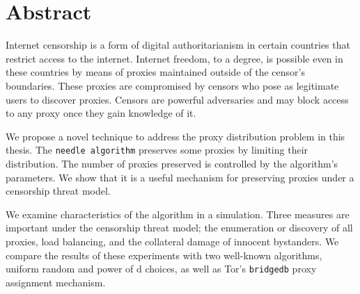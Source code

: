 \chapter{Abstract}
\label{sec:abstract}

Internet censorship is a form of digital authoritarianism in certain countries that restrict access to the internet. Internet freedom, to a degree, is possible even in these countries by means of proxies maintained outside of the censor's boundaries. These proxies are compromised by censors who pose as legitimate users to discover proxies. Censors are powerful adversaries and may block access to any proxy once they gain knowledge of it.

We propose a novel technique to address the proxy distribution problem in this thesis. The \texttt{needle algorithm} preserves some proxies by limiting their distribution. The number of proxies preserved is controlled by the algorithm's parameters. We show that it is a useful mechanism for preserving proxies under a censorship threat model. 

We examine characteristics of the algorithm in a simulation. Three measures are important under the censorship threat model; the enumeration or discovery of all proxies, load balancing, and the collateral damage of innocent bystanders. We compare the results of these experiments with two well-known algorithms, uniform random and power of d choices, as well as Tor's \texttt{bridgedb} proxy assignment mechanism. 
